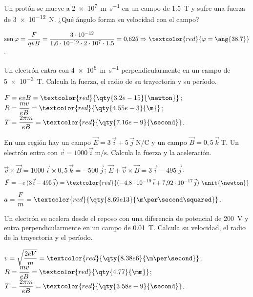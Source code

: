 \begin{exercise}
    Un protón se mueve a \qty{2e7}{\m\per\second} en un campo de \qty{1.5}{\tesla} y sufre una fuerza de \qty{3e-12}{\newton}. ¿Qué ángulo
    forma su velocidad con el campo?
    \begin{solu}
        \(\sen\varphi = \dfrac{F}{qvB} = \dfrac{3\cdot 10^{-12}}{1{,}6\cdot 10^{-19}\cdot 2\cdot 10^7\cdot 1{,}5} = 0{,}625 \Rightarrow \textcolor{red}{\varphi = \ang{38.7}}\).
    \end{solu}
\end{exercise}

\begin{exercise}
    Un electrón entra con \qty{4e6}{\m\per\second} perpendicularmente en un campo de \qty{5e-3}{\tesla}. Calcula la fuerza, el radio de su
    trayectoria y su período.
    \begin{solu}
        \(F = evB = \textcolor{red}{\qty{3.2e-15}{\newton}}\); \(R = \dfrac{m v}{e B} = \textcolor{red}{\qty{4.55e-3}{\m}}\);
        \(T = \dfrac{2\pi m}{e B} = \textcolor{red}{\qty{7.16e-9}{\second}}\).
    \end{solu}
\end{exercise}

\begin{exercise}
    En una región hay un campo \(\vec E = 3\,\vec{i} + 5\,\vec{j}\ \unit{\newton\per\coulomb}\) y un campo \(\vec B = 0{,}5\,\vec{k}\ \unit{\tesla}\).
    Un electrón entra con \(\vec v = 1000\,\vec{i}\ \unit{\m\per\second}\). Calcula la fuerza y la aceleración.
    \begin{solu}
        \(\vec v\times\vec B = 1000\,\vec{i}\times 0{,}5\,\vec{k} = -500\,\vec{j}\); \(\vec E + \vec v\times\vec B = 3\,\vec{i} - 495\,\vec{j}\).
        \[ \vec F = -e\,(3\,\vec{i} - 495\,\vec{j}) = \textcolor{red}{(-4{,}8\cdot 10^{-19}\,\vec{i} + 7{,}92\cdot 10^{-17}\,\vec{j})\ \unit{\newton}} \]
        \(a = \dfrac{F}{m} = \textcolor{red}{\qty{8.69e13}{\m\per\second\squared}}\).
    \end{solu}
\end{exercise}

\begin{exercise}
    Un electrón se acelera desde el reposo con una diferencia de potencial de \qty{200}{\volt} y entra perpendicularmente en un campo de
    \qty{0.01}{\tesla}. Calcula su velocidad, el radio de la trayectoria y el período.
    \begin{solu}
        \(v = \sqrt{\dfrac{2eV}{m}} = \textcolor{red}{\qty{8.38e6}{\m\per\second}}\); \(R = \dfrac{mv}{eB} = \textcolor{red}{\qty{4.77}{\mm}}\);
        \(T = \dfrac{2\pi m}{eB} = \textcolor{red}{\qty{3.58e-9}{\second}}\).
    \end{solu}
\end{exercise}

